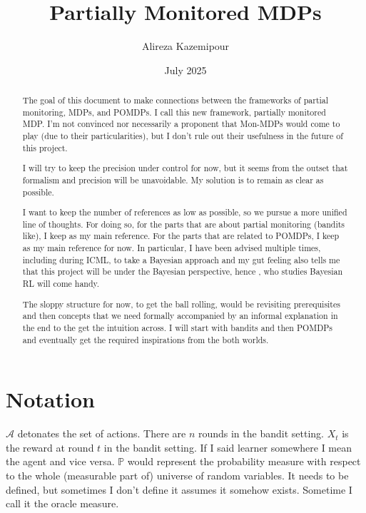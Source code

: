 \documentclass[a4paper]{article}
\title{Partially Monitored MDPs}
\author{Alireza Kazemipour}
\date{July 2025}
\theoremstyle{definition}
\newcommand{\cA}{\mathcal{A}}
\renewcommand{\P}{\mathbb{P}}
\begin{document}
\maketitle

\begin{abstract}
    The goal of this document to make connections between the frameworks of partial monitoring, MDPs, and POMDPs. I call this new framework, partially monitored MDP. I'm not convinced nor necessarily a proponent that Mon-MDPs would come to play (due to their particularities), but I don't rule out their usefulness in the future of this project.

    I will try to keep the precision under control for now, but it seems from the outset that formalism and precision will be unavoidable. My solution is to remain as clear as possible.

    I want to keep the number of references as low as possible, so we pursue a more unified line of thoughts. For doing so, for the parts that are about partial monitoring (bandits like), I keep \citet{lattimore2020bandit} as my main reference. For the parts that are related to POMDPs, I keep \citet{ghavamzadeh2015bayesian} as my main reference for now. In particular, I have been advised multiple times, including during ICML, to take a Bayesian approach and my gut feeling also tells me that this project will be under the 
    Bayesian perspective, hence \citet{ghavamzadeh2015bayesian}, who studies Bayesian RL will come handy.

    The sloppy structure for now, to get the ball rolling, would be revisiting prerequisites and then concepts that we need formally accompanied by an informal explanation in the end to the get the intuition across. I will start with bandits and then POMDPs and eventually get the required inspirations from the both worlds.
\end{abstract}

\section{Notation}
$\cA$ detonates the set of actions. There are $n$ rounds in the bandit setting. $X_t$ is the reward at round $t$ in the bandit setting. If I said learner somewhere I mean the agent and vice versa. $\P$ would represent the probability measure with respect to the whole (measurable part of) universe of random variables. It needs to be defined, but sometimes I don't define it assumes it somehow exists. Sometime I call it the oracle measure. 
\end{document}
